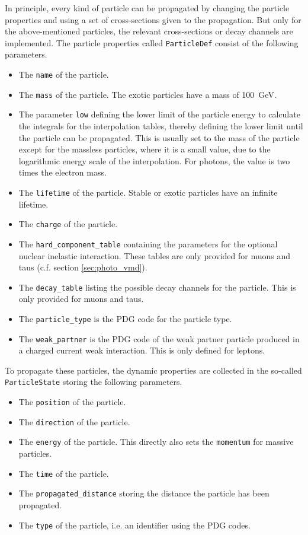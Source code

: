 In principle, every kind of particle can be propagated by changing the particle properties and using a set of cross-sections given to the propagation.
But only for the above-mentioned particles, the relevant cross-sections or decay channels are implemented.
The particle properties called \texttt{ParticleDef} consist of the following parameters.
\begin{itemize}
    \item The \texttt{name} of the particle.
    \item The \texttt{mass} of the particle. The exotic particles have a mass of \SI{100}{GeV}.
    \item The parameter \texttt{low} defining the lower limit of the particle energy to calculate the integrals for the interpolation tables, thereby defining the lower limit until the particle can be propagated.
    This is usually set to the mass of the particle except for the massless particles, where it is a small value, due to the logarithmic energy scale of the interpolation.
    For photons, the value is two times the electron mass.
    \item The \texttt{lifetime} of the particle. Stable or exotic particles have an infinite lifetime.
    \item The \texttt{charge} of the particle.
    \item The \texttt{hard\_component\_table} containing the parameters for the optional nuclear inelastic interaction. These tables are only provided for muons and taus (c.f. section \ref{sec:photo_vmd}).
    \item The \texttt{decay\_table} listing the possible decay channels for the particle. This is only provided for muons and taus.
    \item The \texttt{particle\_type} is the PDG code for the particle type.
    \item The \texttt{weak\_partner} is the PDG code of the weak partner particle produced in a charged current weak interaction. This is only defined for leptons.
\end{itemize}
To propagate these particles, the dynamic properties are collected in the so-called \texttt{ParticleState} storing the following parameters.
\begin{itemize}
    \item The \texttt{position} of the particle.
    \item The \texttt{direction} of the particle.
    \item The \texttt{energy} of the particle. This directly also sets the \texttt{momentum} for massive particles.
    \item The \texttt{time} of the particle.
    \item The \texttt{propagated\_distance} storing the distance the particle has been propagated.
    \item The \texttt{type} of the particle, i.e. an identifier using the PDG codes.
\end{itemize}
